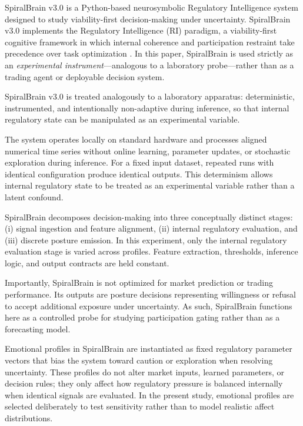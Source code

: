 \documentclass[12pt,a4paper]{article}
\begin{document}
SpiralBrain v3.0 is a Python-based neurosymbolic Regulatory Intelligence system designed to study viability-first decision-making under uncertainty. SpiralBrain v3.0 implements the Regulatory Intelligence (RI) paradigm, a viability-first cognitive framework in which internal coherence and participation restraint take precedence over task optimization \cite{Cragin2026RIParadigm}. In this paper, SpiralBrain is used strictly as an \emph{experimental instrument}—analogous to a laboratory probe—rather than as a trading agent or deployable decision system.

SpiralBrain v3.0 is treated analogously to a laboratory apparatus: deterministic, instrumented, and intentionally non-adaptive during inference, so that internal regulatory state can be manipulated as an experimental variable.

The system operates locally on standard hardware and processes aligned numerical time series without online learning, parameter updates, or stochastic exploration during inference. For a fixed input dataset, repeated runs with identical configuration produce identical outputs. This determinism allows internal regulatory state to be treated as an experimental variable rather than a latent confound.

SpiralBrain decomposes decision-making into three conceptually distinct stages: (i) signal ingestion and feature alignment, (ii) internal regulatory evaluation, and (iii) discrete posture emission. In this experiment, only the internal regulatory evaluation stage is varied across profiles. Feature extraction, thresholds, inference logic, and output contracts are held constant.

Importantly, SpiralBrain is not optimized for market prediction or trading performance. Its outputs are posture decisions representing willingness or refusal to accept additional exposure under uncertainty. As such, SpiralBrain functions here as a controlled probe for studying participation gating rather than as a forecasting model.

Emotional profiles in SpiralBrain are instantiated as fixed regulatory parameter vectors that bias the system toward caution or exploration when resolving uncertainty. These profiles do not alter market inputs, learned parameters, or decision rules; they only affect how regulatory pressure is balanced internally when identical signals are evaluated. In the present study, emotional profiles are selected deliberately to test sensitivity rather than to model realistic affect distributions.
\end{document}
